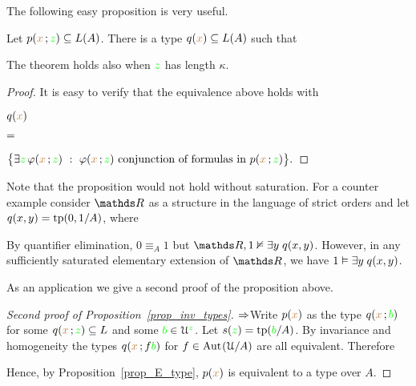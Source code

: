 The following easy proposition is very useful.

\begin{proposition}\label{prop_E_type}
Let $p({\color{brown} x}\,;{\color{green} z})\subseteq L(A)$.
There is a type $q({\color{brown} x})\subseteq L(A)$ such that


The theorem holds also when ${\color{green} z}$ has length $\kappa$.
\end{proposition}

\begin{proof}
  It is easy to verify that the equivalence above holds with
  \def\medrel#1{\parbox{6ex}{$\displaystyle\hfil #1$}}
  \def\ceq#1#2#3{\parbox[b]{10ex}{$\displaystyle #1$}\medrel{#2}$\displaystyle  #3$}

  \ceq{\hfill q({\mr x})}{=}{\big\{ \E {\gr z}\,\phi({\mr x}\,;{\gr z})\ :\ \phi({\mr x}\,;{\gr z}) \textrm{ conjunction of formulas in } p({\mr x}\,;{\gr z}) \big\}.}
\end{proof}

Note that the proposition would not hold without saturation.
For a counter example consider $\RR$ as a structure in the language of strict orders and let $q(x,y)={\rm tp}(0,1/A)$, where 


By quantifier elimination, $0\equiv_{A}1$ but $\RR,1\notmodels\E y\;q(x,y)$.
However, in any sufficiently saturated elementary extension of $\RR$, we have $1\vDash\exists y\;q(x,y)$.

As an application we give a second proof of the proposition above.

\begin{proof}[Second proof of Proposition~\ref{prop_inv_types}] $\Rightarrow$\quad  Write $p({\color{brown} x})$ as the type $q({\color{brown} x}\,;{\color{green} b})$ for some $q({\color{brown} x}\,;{\color{green} z})\subseteq L$ and some ${\color{green} b}\in\EuScript U^{\color{green} z}$.
Let $s({\color{green} z})={\rm tp}({\color{green} b}/A)$.
By invariance and homogeneity the types $q({\color{brown} x}\,;f{\color{green} b})$ for $f\in{\rm Aut\kern.15ex}(\EuScript U/A)$ are all equivalent.
Therefore

\smallskip

\smallskip

\smallskip

Hence, by Proposition~\ref{prop_E_type}, $p({\color{brown} x})$ is equivalent to a type over $A$.
\end{proof}


